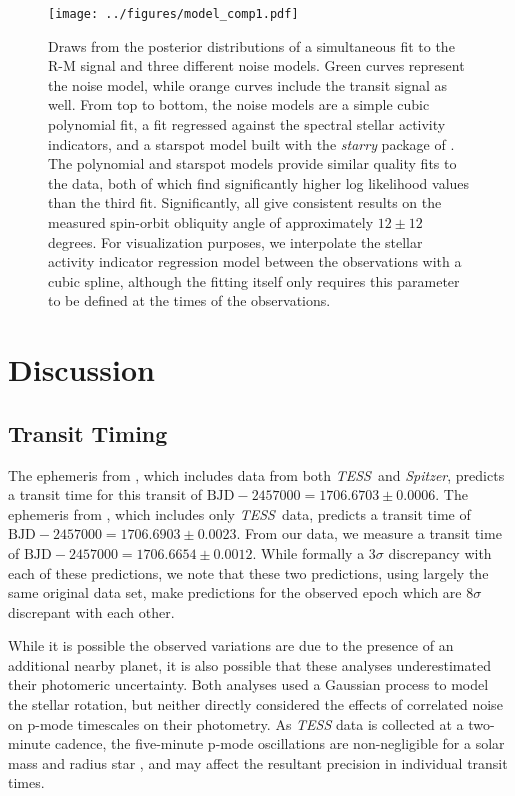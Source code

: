 \documentclass[twocolumn]{aastex63}
\newcommand{\tess}{{\it TESS}}
\newcommand{\spitz}{{\it Spitzer}}
\begin{document}
\begin{figure}[!tbh]
  \begin{center}
    \texttt{[image: ../figures/model\_comp1.pdf]}
   \end{center}
  \caption{Draws from the posterior distributions of a simultaneous fit to the
  R-M signal and three different noise models. Green curves represent the noise model, while orange curves include the transit signal as well. From top to bottom, the noise models are a simple cubic polynomial fit, a fit regressed against the spectral stellar activity indicators, and a starspot model built with the \textit{starry} package of \citep{Luger19}. The polynomial and starspot models provide similar quality fits to the data, both of which find significantly higher log likelihood values than the third fit. Significantly, all give consistent results on the measured spin-orbit obliquity angle of approximately $12 \pm 12$ degrees. For visualization purposes, we interpolate the stellar activity indicator regression model between the observations with a cubic spline, although the fitting itself only requires this parameter to be defined at the times of the observations.}
  \label{fig:models}
\end{figure}

\section{Discussion}
\label{sec:discussion}




\subsection{Transit Timing}

The ephemeris from \citet{Newton19}, which includes data from both \tess\ and \spitz, predicts a transit time for this transit of $\textrm{BJD}- 2457000 = 1706.6703 \pm 0.0006$. 
The ephemeris from \citet{Benatti19}, which includes only \tess\ data, predicts a transit time of  $\textrm{BJD}- 2457000 = 1706.6903 \pm 0.0023$. 
From our data, we measure a transit time of $\textrm{BJD}- 2457000 = 1706.6654 \pm  0.0012$. 
While formally a $3\sigma$ discrepancy with each of these predictions, we note that these two predictions, using largely the same original data set, make predictions for the observed epoch which are $8\sigma$ discrepant with each other. 

While it is possible the observed variations are due to the presence of an additional nearby planet, it is also possible that these analyses underestimated their photomeric uncertainty. 
Both analyses used a Gaussian process to model the stellar rotation, but neither directly considered the effects of correlated noise on p-mode timescales on their photometry. 
As \textit{TESS} data is collected at a two-minute cadence, the five-minute p-mode oscillations are non-negligible for a solar mass and radius star \citep{Chaplin13}, and may affect the resultant precision in individual transit times.
\end{document}
